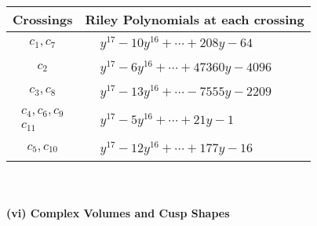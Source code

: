 \documentclass[1p]{elsarticle_modified}
\theoremstyle{definition}
\begin{document}
\begin{tabular}{m{50pt}|m{274pt}}
Crossings & \hspace{64pt}Riley Polynomials at each crossing \\
\hline $$\begin{aligned}c_{1},c_{7}\end{aligned}$$&$\begin{aligned}
&y^{17}-10 y^{16}+\cdots+208 y-64
\end{aligned}$\\
\hline $$\begin{aligned}c_{2}\end{aligned}$$&$\begin{aligned}
&y^{17}-6 y^{16}+\cdots+47360 y-4096
\end{aligned}$\\
\hline $$\begin{aligned}c_{3},c_{8}\end{aligned}$$&$\begin{aligned}
&y^{17}-13 y^{16}+\cdots-7555 y-2209
\end{aligned}$\\
\hline $$\begin{aligned}c_{4},c_{6},c_{9}\\c_{11}\end{aligned}$$&$\begin{aligned}
&y^{17}-5 y^{16}+\cdots+21 y-1
\end{aligned}$\\
\hline $$\begin{aligned}c_{5},c_{10}\end{aligned}$$&$\begin{aligned}
&y^{17}-12 y^{16}+\cdots+177 y-16
\end{aligned}$\\
\hline
\end{tabular}\\~\\
\newpage\flushleft \textbf{(vi) Complex Volumes and Cusp Shapes}
\end{document}
